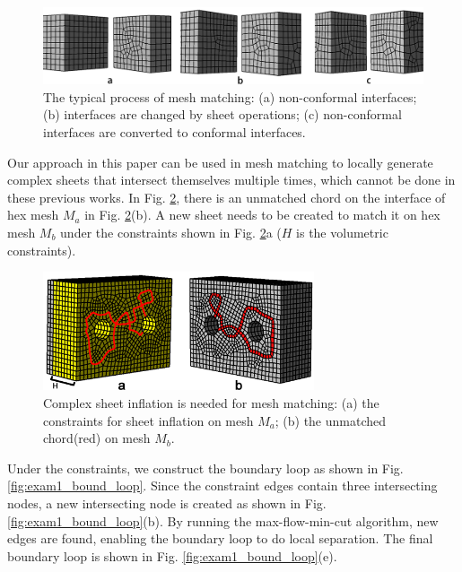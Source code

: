 \documentclass[final,5p,times,twocolumn]{elsarticle}
\begin{document}
\begin{figure}[htbp]
\begin{center}
\includegraphics[width=16.5cm]{mesh_matching.png}
\caption{The typical process of mesh matching: (a) non-conformal interfaces; (b) interfaces are changed by sheet operations; (c) non-conformal interfaces are converted to conformal interfaces.}
\label{fig:mesh_matching_exam}
\end{center}
\end{figure}

Our approach in this paper can be used in mesh matching to locally generate complex sheets that intersect themselves multiple times, which cannot be done in these previous works. In Fig. \ref{fig:exam1_input}, there is an unmatched chord on the interface of hex mesh $M_a$ in Fig. \ref{fig:exam1_input}(b). A new sheet needs to be created to match it on hex mesh $M_b$ under the constraints shown in Fig. \ref{fig:exam1_input}a ($H$ is the volumetric constraints).

\begin{figure}[htbp]
\begin{center}
\includegraphics[width=8cm]{exam1_input.png}
\caption{Complex sheet inflation is needed for mesh matching: (a) the constraints for sheet inflation on mesh $M_a$; (b) the unmatched chord(red) on mesh $M_b$.}
\label{fig:exam1_input}
\end{center}
\end{figure}

Under the constraints, we construct the boundary loop as shown in Fig. \ref{fig:exam1_bound_loop}. Since the constraint edges contain three intersecting nodes, a new intersecting node is created as shown in Fig. \ref{fig:exam1_bound_loop}(b). By running the max-flow-min-cut algorithm, new edges are found, enabling the boundary loop to do local separation. The final boundary loop is shown in Fig. \ref{fig:exam1_bound_loop}(e).
\end{document}

